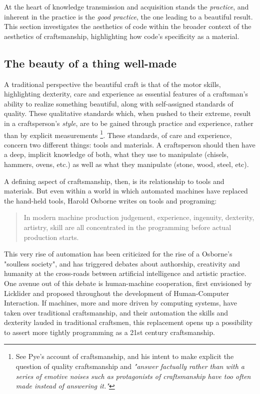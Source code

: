 \documentclass{article}
\begin{document}
At the heart of knowledge transmission and acquisition stands the \emph{practice}, and inherent in the practice is the \emph{good practice}, the one leading to a beautiful result. This section investigates the aesthetics of code within the broader context of the aesthetics of craftsmanship, highlighting how code's specificity as a material.

\subsection{The beauty of a thing well-made}

A traditional perspective the beautiful craft is that of the motor skills, highlighting dexterity, care and experience as essential features of a craftsman's ability to realize something beautiful\cite{osborne_aesthetic_1977}, along with self-assigned standards of quality. These qualitative standards which, when pushed to their extreme, result in a craftsperson's \emph{style}, are to be gained through practice and experience, rather than by explicit measurements\cite{pye_nature_2008} \footnote{See Pye's account of craftsmanship, and his intent to make explicit the question of quality craftsmanship and \emph{"answer factually rather than with a series of emotive noises such as protagonists of craftsmanship have too often made instead of answering it."}}. These standards, of care and experience, concern two different things: tools and materials\cite{pye_nature_2008}. A craftsperson should then have a deep, implicit knowledge of both, what they use to manipulate (chisels, hammers, ovens, etc.) as well as what they manipulate (stone, wood, steel, etc).

A defining aspect of craftsmanship, then, is its relationship to tools and materials. But even within a world in which automated machines have replaced the hand-held tools, Harold Osborne writes on tools and programing:

\begin{quote}
    In modern machine production judgement, experience, ingenuity, dexterity, artistry, skill are all concentrated in the programming before actual production starts.\cite{osborne_aesthetic_1977}
\end{quote}

This very rise of automation has been criticized for the rise of a Osborne's "soulless society", and has triggered debates about authorship, creativity and humanity at the cross-roads between artificial intelligence and artistic practice\cite{mazzone_art_2019}. One avenue out of this debate is human-machine cooperation, first envisioned by Licklider and proposed throughout the development of Human-Computer Interaction\cite{licklider_man-computer_1960,grudin_tool_2016}. If machines, more and more driven by computing systems, have taken over traditional craftsmanship, and their automation the skills and dexterity lauded in traditional craftsmen, this replacement opens up a possibility to assert more tightly programming as a 21st century craftsmanship.
\end{document}
